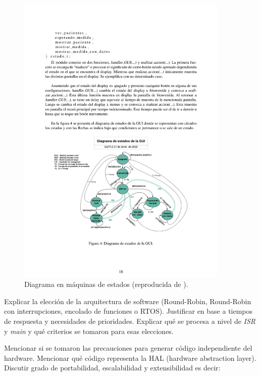 \documentclass[a4paper,12pt]{article}
\begin{document}
\begin{linenumbers}
\begin{figure}[ht]
  \begin{center}
    \includegraphics[width=0.9\textwidth]{maquina.pdf}
  \end{center}
  \caption{Diagrama en máquinas de estados (reproducida de \cite{cabrera2019}). }
  \label{fig:maquina}
\end{figure}

Explicar la elecci\'on de la arquitectura de software (Round-Robin, Round-Robin con interrupciones, encolado de funciones o RTOS). Justificar en base a tiempos de respuesta y necesidades de prioridades. Explicar qué se procesa a nivel de \textit{ISR} y \textit{main} y qué criterios se tomaron para esas elecciones.

Mencionar si se tomaron las precauciones para generar c\'odigo independiente del hardware. Mencionar qué c\'odigo representa la HAL (hardware abstraction layer). Discutir grado de portabilidad, escalabilidad y extensibilidad es decir: 


\end{linenumbers}
\end{document}
